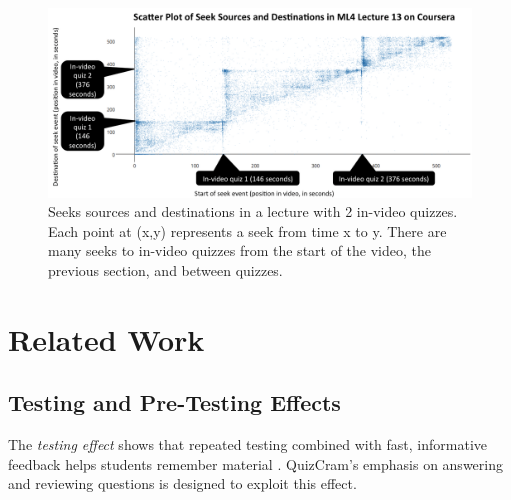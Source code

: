 \documentclass{sigchi}
\begin{document}
\begin{figure}
\includegraphics[width=\columnwidth]{seek-scatterplot}
\caption{Seeks sources and destinations in a lecture with 2 in-video quizzes. Each point at (x,y) represents a seek from time x to y. There are many seeks to in-video quizzes from the start of the video, the previous section, and between quizzes.} %
\label{fig:seek-scatterplot}
\end{figure}

\section{Related Work}

\subsection{Testing and Pre-Testing Effects}

The \emph{testing effect} shows that repeated testing combined with fast, informative feedback helps students remember material \cite{testingeffect}. QuizCram's emphasis on answering and reviewing questions is designed to exploit this effect.

\end{document}
